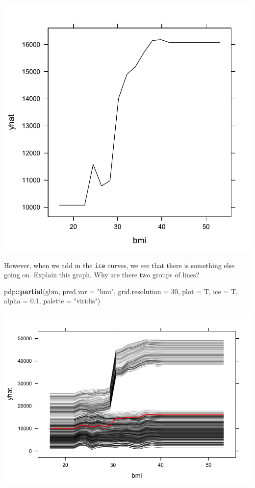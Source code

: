 \documentclass[openany]{book}
\newenvironment{Shaded}{\begin{snugshade}}{\end{snugshade}}
\newcommand{\DataTypeTok}[1]{\textcolor[rgb]{0.13,0.29,0.53}{#1}}
\newcommand{\DecValTok}[1]{\textcolor[rgb]{0.00,0.00,0.81}{#1}}
\newcommand{\FloatTok}[1]{\textcolor[rgb]{0.00,0.00,0.81}{#1}}
\newcommand{\KeywordTok}[1]{\textcolor[rgb]{0.13,0.29,0.53}{\textbf{#1}}}
\newcommand{\NormalTok}[1]{#1}
\newcommand{\OperatorTok}[1]{\textcolor[rgb]{0.81,0.36,0.00}{\textbf{#1}}}
\newcommand{\StringTok}[1]{\textcolor[rgb]{0.31,0.60,0.02}{#1}}
\begin{document}
\includegraphics{06-tree-based-models_files/figure-latex/unnamed-chunk-32-1.pdf}

However, when we add in the \texttt{ice} curves, we see that there is something else going on. Explain this graph. Why are there two groups of lines?

\begin{Shaded}
\begin{Highlighting}[]
\NormalTok{pdp}\OperatorTok{::}\KeywordTok{partial}\NormalTok{(gbm, }\DataTypeTok{pred.var =} \StringTok{"bmi"}\NormalTok{, }\DataTypeTok{grid.resolution =} \DecValTok{30}\NormalTok{, }\DataTypeTok{plot =}\NormalTok{ T, }\DataTypeTok{ice =}\NormalTok{ T, }\DataTypeTok{alpha =} \FloatTok{0.1}\NormalTok{, }\DataTypeTok{palette =} \StringTok{"viridis"}\NormalTok{)}
\end{Highlighting}
\end{Shaded}

\includegraphics{06-tree-based-models_files/figure-latex/unnamed-chunk-33-1.pdf}
\end{document}
